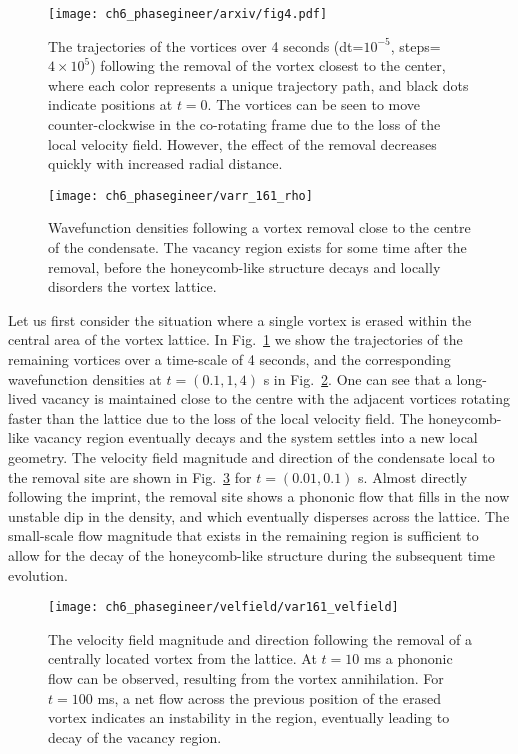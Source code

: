 \begin{figure}\centering
\texttt{[image: ch6\_phasegineer/arxiv/fig4.pdf]}
    \caption{The trajectories of the vortices over 4 seconds (dt=$10^{-5}$, steps=$4\times 10^{5}$) following the removal of the vortex closest to the center, where each color represents a unique trajectory path, and black dots indicate positions at $t=0$. The vortices can be seen to move counter-clockwise in the co-rotating frame due to the loss of the local velocity field. However, the effect of the removal decreases quickly with increased radial distance. }
    \label{fig:trajplot}
\end{figure}


\begin{figure}\centering
\texttt{[image: ch6\_phasegineer/varr\_161\_rho]}
    \caption{ Wavefunction densities following a vortex removal close to the centre of the condensate. The vacancy region exists for some time after the removal, before the honeycomb-like structure decays and locally disorders the vortex lattice. }
    \label{fig:varr161_rho}
\end{figure}
Let us first consider the situation where a single vortex is erased within the central area of the vortex lattice. In Fig.~\ref{fig:trajplot} we show the trajectories of the remaining vortices over a time-scale of 4 seconds, and the corresponding wavefunction densities at $t=(0.1,1,4)$ s in Fig.~\ref{fig:varr161_rho}. One can see that a long-lived vacancy is maintained close to the centre with the adjacent vortices rotating faster than the lattice due to the loss of the local velocity field. The honeycomb-like vacancy region eventually decays and the system settles into a new local geometry. The velocity field magnitude and direction of the condensate local to the removal site are shown in Fig.~\ref{fig:varr161_velfield} for $t=(0.01,0.1)$ s. Almost directly following the imprint, the removal site shows a phononic flow that fills in the now unstable dip in the density, and which eventually disperses across the lattice. The small-scale flow magnitude that exists in the remaining region is sufficient to allow for the decay of the honeycomb-like structure during the subsequent time evolution.

\begin{figure}\centering
    \texttt{[image: ch6\_phasegineer/velfield/var161\_velfield]}
    \caption{The velocity field magnitude and direction following the removal of a centrally located vortex from the lattice. At $t=10$ ms a phononic flow can be observed, resulting from the vortex annihilation. For $t=100$ ms, a net flow across the previous position of the erased vortex indicates an instability in the region, eventually leading to decay of the vacancy region. }\label{fig:varr161_velfield}
\end{figure}

